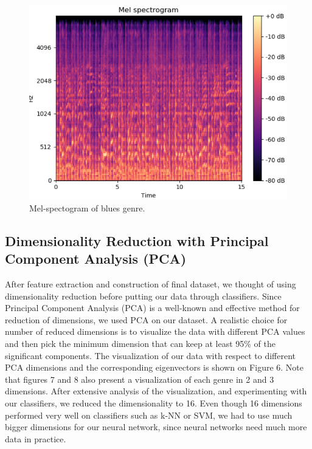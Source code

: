 \begin{figure}
\begin{center}
\includegraphics[scale=0.2]{./figures/blues.png}
\end{center}
\caption
{
Mel-spectogram of blues genre. 
}
\label{fig:big_picture5}
\end{figure}

\subsection{Dimensionality Reduction with Principal Component Analysis (PCA)}
After feature extraction and construction of final dataset, we thought of using dimensionality reduction before putting our data through classifiers. Since Principal Component Analysis (PCA) is a well-known and effective method for reduction of dimensions, we used PCA on our dataset. A realistic choice for number of reduced dimensions is to visualize the data with different PCA values and then pick the minimum dimension that can keep at least 95\% of the significant components. The visualization of our data with respect to different PCA dimensions and the corresponding eigenvectors is shown on Figure 6. Note that figures 7 and 8 also present a visualization of each genre in 2 and 3 dimensions. After extensive analysis of the visualization, and experimenting with our classifiers, we reduced the dimensionality to 16. Even though 16 dimensions performed very well on classifiers such as k-NN or SVM, we had to use much bigger dimensions for our neural network, since neural networks need much more data in practice. 

